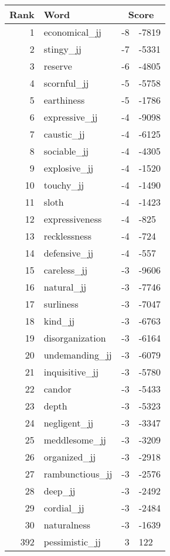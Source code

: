 \begin{longtable}[!htbp]{| rlr@{.}l |}
    \hline
    \textbf{Rank} & \textbf{Word} & \multicolumn{2}{c|}{\textbf{Score}} \\
    \hline
    \endhead
    1 & economical\_jj & -8 & -7819 \\
    2 & stingy\_jj & -7 & -5331 \\
    3 & reserve & -6 & -4805 \\
    4 & scornful\_jj & -5 & -5758 \\
    5 & earthiness & -5 & -1786 \\
    6 & expressive\_jj & -4 & -9098 \\
    7 & caustic\_jj & -4 & -6125 \\
    8 & sociable\_jj & -4 & -4305 \\
    9 & explosive\_jj & -4 & -1520 \\
    10 & touchy\_jj & -4 & -1490 \\
    11 & sloth & -4 & -1423 \\
    12 & expressiveness & -4 & -825 \\
    13 & recklessness & -4 & -724 \\
    14 & defensive\_jj & -4 & -557 \\
    15 & careless\_jj & -3 & -9606 \\
    16 & natural\_jj & -3 & -7746 \\
    17 & surliness & -3 & -7047 \\
    18 & kind\_jj & -3 & -6763 \\
    19 & disorganization & -3 & -6164 \\
    20 & undemanding\_jj & -3 & -6079 \\
    21 & inquisitive\_jj & -3 & -5780 \\
    22 & candor & -3 & -5433 \\
    23 & depth & -3 & -5323 \\
    24 & negligent\_jj & -3 & -3347 \\
    25 & meddlesome\_jj & -3 & -3209 \\
    26 & organized\_jj & -3 & -2918 \\
    27 & rambunctious\_jj & -3 & -2576 \\
    28 & deep\_jj & -3 & -2492 \\
    29 & cordial\_jj & -3 & -2484 \\
    30 & naturalness & -3 & -1639 \\
    392 & pessimistic\_jj & 3 & 122 \\

\end{longtable}
